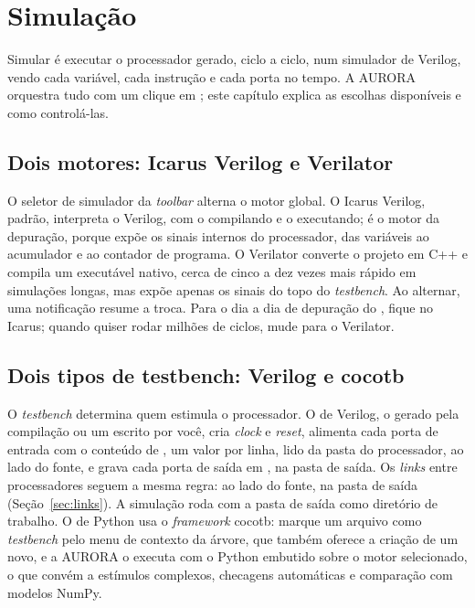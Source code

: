 \chapter{Simulação}
\label{cap:simulacao}

Simular é executar o processador gerado, ciclo a ciclo, num simulador de Verilog, vendo cada variável, cada instrução e cada porta no tempo. A AURORA orquestra tudo com um clique em ; este capítulo explica as escolhas disponíveis e como controlá-las.

\section{Dois motores: Icarus Verilog e Verilator}
\label{sec:motores}

O seletor de simulador da \textit{toolbar} alterna o motor global. O Icarus Verilog, padrão, interpreta o Verilog, com o  compilando e o  executando; é o motor da depuração, porque expõe os sinais internos do processador, das variáveis ao acumulador e ao contador de programa. O Verilator converte o projeto em C++ e compila um executável nativo, cerca de cinco a dez vezes mais rápido em simulações longas, mas expõe apenas os sinais do topo do \textit{testbench}. Ao alternar, uma notificação resume a troca. Para o dia a dia de depuração do , fique no Icarus; quando quiser rodar milhões de ciclos, mude para o Verilator.

\section{Dois tipos de testbench: Verilog e cocotb}

O \textit{testbench} determina quem estimula o processador. O de Verilog, o  gerado pela compilação ou um escrito por você, cria \textit{clock} e \textit{reset}, alimenta cada porta de entrada com o conteúdo de , um valor por linha, lido da pasta do processador, ao lado do fonte, e grava cada porta de saída em , na pasta de saída. Os \textit{links} entre processadores seguem a mesma regra:  ao lado do fonte,  na pasta de saída (Seção~\ref{sec:links}). A simulação roda com a pasta de saída como diretório de trabalho. O de Python usa o \textit{framework} cocotb: marque um arquivo  como \textit{testbench} pelo menu de contexto da árvore, que também oferece a criação de um novo, e a AURORA o executa com o Python embutido sobre o motor selecionado, o que convém a estímulos complexos, checagens automáticas e comparação com modelos NumPy.


